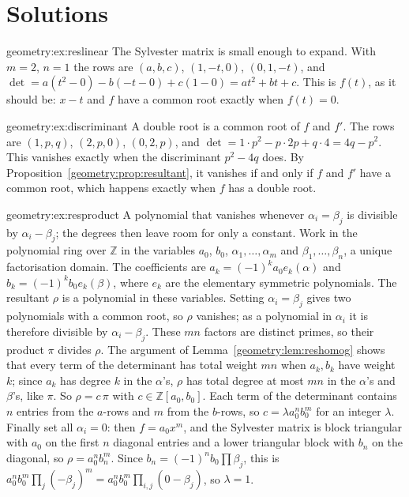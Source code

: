 \section{Solutions}

\begin{solution}{geometry:ex:reslinear}
\idea The Sylvester matrix is small enough to expand.
\writeup With $m=2$, $n=1$ the rows are $(a,b,c)$, $(1,-t,0)$, $(0,1,-t)$, and
$\det=a(t^2-0)-b(-t-0)+c(1-0)=at^2+bt+c$. This is $f(t)$, as it should be: $x-t$ and $f$ have a common root exactly when $f(t)=0$.
\end{solution}

\begin{solution}{geometry:ex:discriminant}
\idea A double root is a common root of $f$ and $f'$.
\writeup The rows are $(1,p,q)$, $(2,p,0)$, $(0,2,p)$, and $\det=1\cdot p^2-p\cdot2p+q\cdot4=4q-p^2$. This vanishes exactly when the discriminant
$p^2-4q$ does. By Proposition~\ref{geometry:prop:resultant}, it vanishes if and only if $f$ and $f'$ have a common root, which happens exactly when $f$ has a double root.
\end{solution}

\begin{solution}{geometry:ex:resproduct}
\idea A polynomial that vanishes whenever $\alpha_i=\beta_j$ is divisible by $\alpha_i-\beta_j$; the degrees then leave room for only a constant.
\writeup Work in the polynomial ring over $\mathbb Z$ in the variables $a_0$, $b_0$, $\alpha_1,\dots,\alpha_m$ and $\beta_1,\dots,\beta_n$, a unique factorisation domain. The coefficients are
$a_k=(-1)^ka_0e_k(\alpha)$ and $b_k=(-1)^kb_0e_k(\beta)$, where $e_k$ are the elementary symmetric polynomials. The resultant $\rho$ is a polynomial in these
variables. Setting $\alpha_i=\beta_j$ gives two polynomials with a common root, so $\rho$ vanishes; as a polynomial in $\alpha_i$ it is therefore divisible by
$\alpha_i-\beta_j$. These $mn$ factors are distinct primes, so their product $\pi$ divides $\rho$. The argument of Lemma~\ref{geometry:lem:reshomog} shows that every term
of the determinant has total weight $mn$ when $a_k,b_k$ have weight $k$; since $a_k$ has degree $k$ in the $\alpha$'s, $\rho$ has total degree at most $mn$ in the
$\alpha$'s and $\beta$'s, like $\pi$. So $\rho=c\,\pi$ with $c\in\mathbb Z[a_0,b_0]$. Each term of the determinant contains $n$ entries from the $a$-rows and $m$ from the
$b$-rows, so $c=\lambda a_0^nb_0^m$ for an integer $\lambda$. Finally set all $\alpha_i=0$: then $f=a_0x^m$, and the Sylvester matrix is block triangular with
$a_0$ on the first $n$ diagonal entries and a lower triangular block with $b_n$ on the diagonal, so $\rho=a_0^nb_n^m$. Since $b_n=(-1)^nb_0\prod\beta_j$, this is
$a_0^nb_0^m\prod_j(-\beta_j)^m=a_0^nb_0^m\prod_{i,j}(0-\beta_j)$, so $\lambda=1$.
\end{solution}

